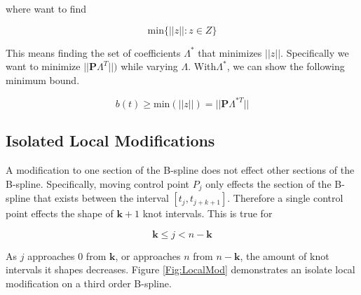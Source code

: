 \documentclass{article}
\begin{document}
where want to find

\begin{equation}
    \text{min}\{||z|| : z \in Z\}
\end{equation}

This means finding the set of coefficients \(\Lambda^*\) that minimizes \(||z||\). Specifically we want to minimize \(||\textbf{P} \Lambda^{T}||)\) while varying \(\Lambda\). With\(\Lambda^*\), we can show the following minimum bound.

\begin{equation}
    b(t) \geq \text{min}(||z||) = ||\textbf{P} \Lambda^{*T}||
\end{equation}



    
    \subsection{Isolated Local Modifications}
    A modification to one section of the B-spline does not effect other sections of the B-spline. Specifically, moving control point \(P_{j}\) only effects the section of the B-spline that exists between the interval \([t_j, t_{j+k+1}]\). Therefore a single control point effects the shape of \(\textbf{k}+1\) knot intervals. This is true for 
    
    \begin{equation} \textbf{k}  \leq j < n - \textbf{k}
    \end{equation}
    
     As \(j\) approaches \(0\) from \(\textbf{k}\), or approaches \(n\) from \(n-\textbf{k}\), the amount of knot intervals it shapes decreases. Figure \ref{Fig:LocalMod} demonstrates an isolate local modification on a third order B-spline.
     
\end{document}
